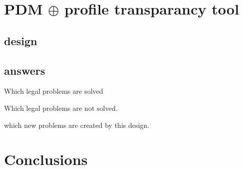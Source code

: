 \documentclass{article}
\begin{document}
\section{PDM $\oplus$ profile transparancy tool}

\subsection{design}

\subsection{answers}

Which legal problems are solved

Which legal problems are not solved.

which new problems are created by this design.

\section{Conclusions}
\end{document}
